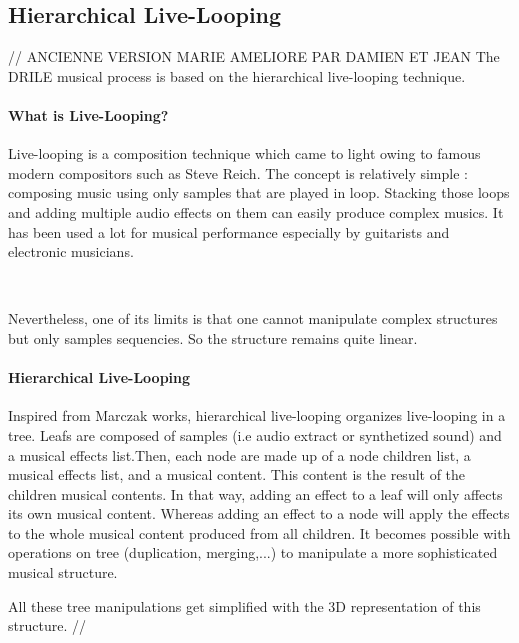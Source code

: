 \subsection{Hierarchical Live-Looping}
// ANCIENNE VERSION MARIE AMELIORE PAR DAMIEN ET JEAN
The DRILE musical process is based on the hierarchical live-looping technique.

\paragraph{What is Live-Looping?}

Live-looping is a composition technique which came to light owing to famous modern compositors such as Steve Reich.
The concept is relatively simple : composing music using only samples that are played in loop. Stacking those loops and adding multiple audio effects on them can easily produce complex musics.
It has been used a lot for musical performance especially by guitarists and electronic musicians.

~

Nevertheless, one of its limits is that one cannot manipulate complex structures but only samples sequencies. So the structure remains quite linear.

\paragraph{Hierarchical Live-Looping}

Inspired from Marczak \cite{marczak2007etude} works, hierarchical live-looping organizes live-looping in a tree. Leafs are composed of samples (i.e audio extract or synthetized sound) and a musical effects list.Then, each node are made up of a node children list, a musical effects list, and a musical content. This content is the result of the children musical contents.
In that way, adding an effect to a leaf will only affects its own musical content. Whereas adding an effect to a node will apply the effects to the whole musical content produced from all children. It becomes possible with operations on tree (duplication, merging,...) to manipulate a more sophisticated musical structure. 

All these tree manipulations get simplified with the 3D representation of this structure.
//

